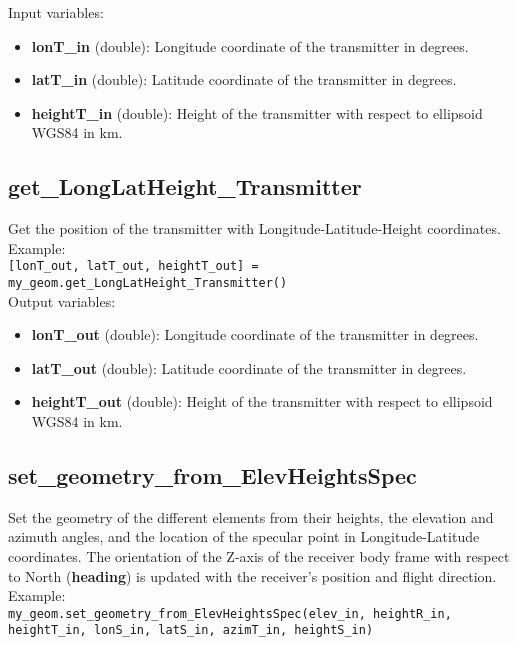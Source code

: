Input variables:
\begin{itemize}
\item {\bf lonT\_in} (double): Longitude coordinate of the transmitter in degrees.
\item {\bf latT\_in} (double): Latitude coordinate of the transmitter in degrees.
\item {\bf heightT\_in} (double): Height of the transmitter with respect to ellipsoid WGS84 in km.
\end{itemize}


\subsection{get\_LongLatHeight\_Transmitter}

Get the position of the transmitter with Longitude-Latitude-Height coordinates.\\

Example:\\

\texttt{[lonT\_out, latT\_out, heightT\_out] = my\_geom.get\_LongLatHeight\_Transmitter()}\\

Output variables:
\begin{itemize}
\item {\bf lonT\_out} (double): Longitude coordinate of the transmitter in degrees.
\item {\bf latT\_out} (double): Latitude coordinate of the transmitter in degrees.
\item {\bf heightT\_out} (double): Height of the transmitter with respect to ellipsoid WGS84 in km.
\end{itemize}


\subsection{set\_geometry\_from\_ElevHeightsSpec}

Set the geometry of the different elements from their heights, the elevation and azimuth angles, and the location of the specular point in Longitude-Latitude coordinates. The orientation of the Z-axis of the receiver body frame with respect to North ({\bf heading}) is updated with the receiver's position and flight direction.\\

Example:\\

\texttt{my\_geom.set\_geometry\_from\_ElevHeightsSpec(elev\_in, heightR\_in, heightT\_in, lonS\_in, latS\_in, azimT\_in, heightS\_in)}\\

